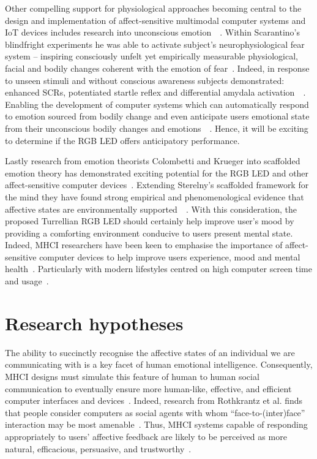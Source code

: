 \documentclass{sigchi}
\begin{document}
Other compelling support for physiological approaches becoming central to the design and implementation of affect-sensitive multimodal computer systems and IoT devices includes research into unconscious emotion~\cite{scarantino2010insights}~\cite{winkielman2004unconscious}. Within Scarantino’s blindfright experiments he was able to activate subject’s neurophysiological fear system – inspiring consciously unfelt yet empirically measurable physiological, facial and bodily changes coherent with the emotion of fear~\cite{scarantino2010insights}. Indeed, in response to unseen stimuli and without conscious awareness subjects demonstrated: enhanced SCRs, potentiated startle reflex and differential amydala activation~\cite{scarantino2010insights}~\cite{winkielman2004unconscious}. Enabling the development of computer systems which can automatically respond to emotion sourced from bodily change and even anticipate users emotional state from their unconscious bodily changes and emotions~\cite{scarantino2010insights}~\cite{smith2016unconscious}. Hence, it will be exciting to determine if the RGB LED offers anticipatory performance.

Lastly research from emotion theorists Colombetti and Krueger into scaffolded emotion theory has demonstrated exciting potential for the RGB LED and other affect-sensitive computer devices~\cite{colombetti2015scaffoldings}. Extending Sterelny’s scaffolded framework for the mind they have found strong empirical and phenomenological evidence that affective states are environmentally supported~\cite{sterelny2010minds}~\cite{sterelny2004externalism}. With this consideration, the proposed Turrellian RGB LED should certainly help improve user’s mood by providing a comforting environment conducive to users present mental state. Indeed, MHCI researchers have been keen to emphasise the importance of affect-sensitive computer devices to help improve users experience, mood and mental health~\cite{}. Particularly with modern lifestyles centred on high computer screen time and usage~\cite{}. 

\section{Research hypotheses}

The ability to succinctly recognise the affective states of an individual we are communicating with is a key facet of human emotional intelligence. Consequently, MHCI designs must simulate this feature of human to human social communication to eventually ensure more human-like, effective, and efficient computer interfaces and devices~\cite{fitriani2007multimodal}. Indeed, research from Rothkrantz et al. finds that people consider computers as social agents with whom “face-to-(inter)face” interaction may be most amenable~\cite{pantic2003toward}. Thus, MHCI systems capable of responding appropriately to users’ affective feedback are likely to be perceived as more natural, efficacious, persuasive, and trustworthy~\cite{pantic2003toward}.
\end{document}
